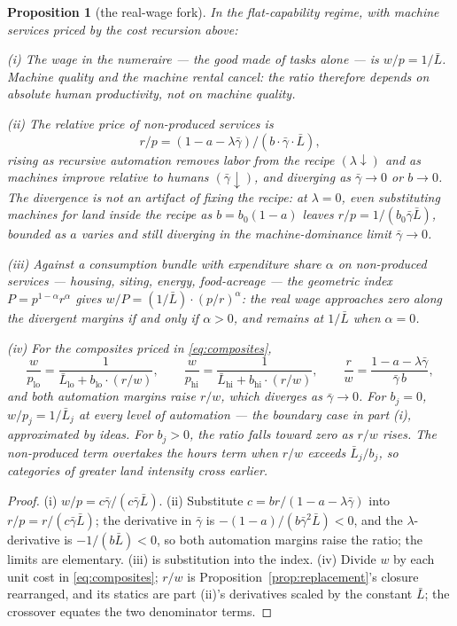\documentclass[12pt]{article}
\theoremstyle{plain}
\newtheorem{proposition}{Proposition}
\newcommand{\lo}{\mathrm{lo}}
\newcommand{\hi}{\mathrm{hi}}
\begin{document}
\begin{proposition}[the real-wage fork]\label{prop:fork}
In the flat-capability regime, with machine services priced by the cost recursion above:

(i) The wage in the numeraire --- the good made of tasks alone --- is $w/p = 1/\bar{L}$. Machine quality and the machine rental cancel: the ratio therefore depends on absolute human productivity, not on machine quality.

(ii) The relative price of non-produced services is
\begin{equation}\label{eq:fork-price}
r/p = (1 - a - \lambda \bar{\gamma}) / (b\cdot \bar{\gamma}\cdot \bar{L}),
\end{equation}
rising as recursive automation removes labor from the recipe $(\lambda\downarrow)$ and as machines improve relative to humans $(\bar{\gamma}\downarrow)$, and diverging as $\bar{\gamma}\to0$ or $b\to0$. The divergence is not an artifact of fixing the recipe: at $\lambda=0$, even substituting machines for land inside the recipe as $b=b_0(1-a)$ leaves $r/p=1/(b_0\bar{\gamma}\bar{L})$, bounded as $a$ varies and still diverging in the machine-dominance limit $\bar{\gamma}\to0$.

(iii) Against a consumption bundle with expenditure share $\alpha$ on non-produced services --- housing, siting, energy, food-acreage --- the geometric index $P = p^{1-\alpha}r^{\alpha}$ gives $w/P = (1/\bar{L})\cdot (p/r)^{\alpha}$: the real wage approaches zero along the divergent margins if and only if $\alpha > 0$, and remains at $1/\bar{L}$ when $\alpha = 0$.

(iv) For the composites priced in \eqref{eq:composites},
\begin{equation}\label{eq:fork-pair}
\frac{w}{p_{\lo}} = \frac{1}{\bar{L}_{\lo} + b_{\lo}\cdot (r/w)},
\qquad
\frac{w}{p_{\hi}} = \frac{1}{\bar{L}_{\hi} + b_{\hi}\cdot (r/w)},
\qquad
\frac{r}{w} = \frac{1-a-\lambda\bar{\gamma}}{\bar{\gamma}\, b},
\end{equation}
and both automation margins raise $r/w$, which diverges as $\bar{\gamma}\to0$. For $b_j=0$, $w/p_j=1/\bar{L}_j$ at every level of automation --- the boundary case in part (i), approximated by ideas. For $b_j>0$, the ratio falls toward zero as $r/w$ rises. The non-produced term overtakes the hours term when $r/w$ exceeds $\bar{L}_j/b_j$, so categories of greater land intensity cross earlier.
\end{proposition}

\begin{proof}
(i) $w/p = c\bar{\gamma}/(c\bar{\gamma}\bar{L})$. (ii) Substitute $c = br/(1-a-\lambda \bar{\gamma})$ into $r/p = r/(c\bar{\gamma}\bar{L})$; the derivative in $\bar{\gamma}$ is $-(1-a)/(b\bar{\gamma}^2\bar{L}) < 0$, and the $\lambda$-derivative is $-1/(b\bar{L}) < 0$, so both automation margins raise the ratio; the limits are elementary. (iii) is substitution into the index. (iv) Divide $w$ by each unit cost in \eqref{eq:composites}; $r/w$ is Proposition~\ref{prop:replacement}'s closure rearranged, and its statics are part (ii)'s derivatives scaled by the constant $\bar{L}$; the crossover equates the two denominator terms.
\end{proof}
\end{document}
